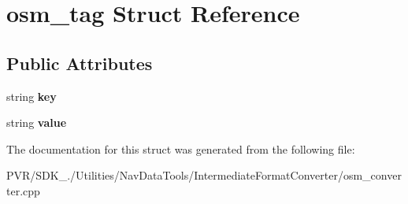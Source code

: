\hypertarget{structosm__tag}{\section{osm\+\_\+tag Struct Reference}
\label{structosm__tag}
}
\subsection*{Public Attributes}
\begin{DoxyCompactItemize}
\item 
\hypertarget{structosm__tag_a395ad474c73eae83ca4f9a22156ab701}{string {\bfseries key}}\label{structosm__tag_a395ad474c73eae83ca4f9a22156ab701}

\item 
\hypertarget{structosm__tag_a61bbde37178b4b0211936e87e595b879}{string {\bfseries value}}\label{structosm__tag_a61bbde37178b4b0211936e87e595b879}

\end{DoxyCompactItemize}


The documentation for this struct was generated from the following file\+:\begin{DoxyCompactItemize}
\item 
P\+V\+R/\+S\+D\+K\+\_./\+Utilities/\+Nav\+Data\+Tools/\+Intermediate\+Format\+Converter/osm\+\_\+converter.\+cpp\end{DoxyCompactItemize}
